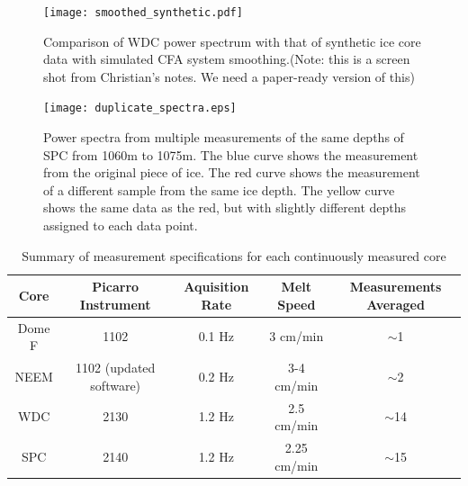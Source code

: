 \documentclass[draft, jgrga]{AGUTeX}
\begin{document}
\begin{figure}
	\texttt{[image: smoothed\_synthetic.pdf]}
	\caption{Comparison of WDC power spectrum with that of synthetic ice core data with simulated CFA system smoothing.(Note: this is a screen shot from Christian's notes. We need a paper-ready version of this)} \label{smoothed_synthetic}
\end{figure}

\begin{figure}
	\texttt{[image: duplicate\_spectra.eps]}
	\caption{Power spectra from multiple measurements of the same depths of SPC from 1060m to 1075m. The blue curve shows the measurement from the original piece of ice. The red curve shows the measurement of a different sample from the same ice depth. The yellow curve shows the same data as the red, but with slightly different depths assigned to each data point.} \label{duplicate_spectra}
\end{figure}

\begin{table}
\caption{Summary of measurement specifications for each continuously measured core}
\label{tab:picarro_table}
\centering
\begin{tabular}{|c | c c c c|}
\hline
Core  & Picarro Instrument & Aquisition Rate & Melt Speed & Measurements Averaged \\
\hline
Dome F  & 1102 & 0.1 Hz & 3 cm/min & $\sim$1   \\
NEEM & 1102 (updated software) & 0.2 Hz & 3-4 cm/min & $\sim$2   \\
WDC & 2130 & 1.2 Hz & 2.5 cm/min & $\sim$14   \\
SPC & 2140 & 1.2 Hz & 2.25 cm/min & $\sim$15   \\
\hline
\end{tabular}
\end{table}
\end{document}
